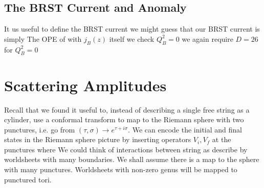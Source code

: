\documentclass{article}
\begin{document}
\subsection{The BRST Current and Anomaly}
It us useful to define the BRST current 
we might guess that our BRST current is simply 
The OPE of with $j_B(z)$ itself
we check $Q_B^2 = 0$ 
we again require $D=26$ for $Q_B^2 = 0$

\section{Scattering Amplitudes}

\begin{idea}
Recall that we found it useful to, instead of describing a single free string as a cylinder, use a conformal transform to map to the Riemann sphere with two punctures, i.e. go from $(\tau, \sigma) \to e^{\tau + i \sigma}$. We can encode the initial and final states in the Riemann sphere picture by inserting operators $V_i, V_f$ at the punctures where 
We could think of interactions between string as describe by worldsheets with many boundaries. We shall assume there is a map to the sphere with many punctures. Worldsheets with non-zero genus will be mapped to punctured tori. 
\end{idea}
\end{document}
